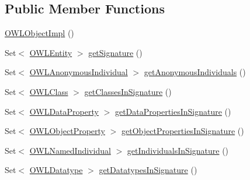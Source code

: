 \subsection*{Public Member Functions}
\begin{DoxyCompactItemize}
\item 
\hyperlink{classuk_1_1ac_1_1manchester_1_1cs_1_1owl_1_1owlapi_1_1_o_w_l_object_impl_adb32e4f033cf4062d7d9cb72f18c4ae1}{O\-W\-L\-Object\-Impl} ()
\item 
Set$<$ \hyperlink{interfaceorg_1_1semanticweb_1_1owlapi_1_1model_1_1_o_w_l_entity}{O\-W\-L\-Entity} $>$ \hyperlink{classuk_1_1ac_1_1manchester_1_1cs_1_1owl_1_1owlapi_1_1_o_w_l_object_impl_a3f510778e0d7a8bae2b6e5b7b8934654}{get\-Signature} ()
\item 
Set$<$ \hyperlink{interfaceorg_1_1semanticweb_1_1owlapi_1_1model_1_1_o_w_l_anonymous_individual}{O\-W\-L\-Anonymous\-Individual} $>$ \hyperlink{classuk_1_1ac_1_1manchester_1_1cs_1_1owl_1_1owlapi_1_1_o_w_l_object_impl_a14c25608f7bfddf821c860b3f862479e}{get\-Anonymous\-Individuals} ()
\item 
Set$<$ \hyperlink{interfaceorg_1_1semanticweb_1_1owlapi_1_1model_1_1_o_w_l_class}{O\-W\-L\-Class} $>$ \hyperlink{classuk_1_1ac_1_1manchester_1_1cs_1_1owl_1_1owlapi_1_1_o_w_l_object_impl_a1eb866bd30aefe55594f38cc228926bc}{get\-Classes\-In\-Signature} ()
\item 
Set$<$ \hyperlink{interfaceorg_1_1semanticweb_1_1owlapi_1_1model_1_1_o_w_l_data_property}{O\-W\-L\-Data\-Property} $>$ \hyperlink{classuk_1_1ac_1_1manchester_1_1cs_1_1owl_1_1owlapi_1_1_o_w_l_object_impl_ad9c426c1f4cc140b3afaf02870d80c40}{get\-Data\-Properties\-In\-Signature} ()
\item 
Set$<$ \hyperlink{interfaceorg_1_1semanticweb_1_1owlapi_1_1model_1_1_o_w_l_object_property}{O\-W\-L\-Object\-Property} $>$ \hyperlink{classuk_1_1ac_1_1manchester_1_1cs_1_1owl_1_1owlapi_1_1_o_w_l_object_impl_ac0cb9b8a630c8c2eb8759264d0baafce}{get\-Object\-Properties\-In\-Signature} ()
\item 
Set$<$ \hyperlink{interfaceorg_1_1semanticweb_1_1owlapi_1_1model_1_1_o_w_l_named_individual}{O\-W\-L\-Named\-Individual} $>$ \hyperlink{classuk_1_1ac_1_1manchester_1_1cs_1_1owl_1_1owlapi_1_1_o_w_l_object_impl_a162ee8fd6eeee784c409361a2340e926}{get\-Individuals\-In\-Signature} ()
\item 
Set$<$ \hyperlink{interfaceorg_1_1semanticweb_1_1owlapi_1_1model_1_1_o_w_l_datatype}{O\-W\-L\-Datatype} $>$ \hyperlink{classuk_1_1ac_1_1manchester_1_1cs_1_1owl_1_1owlapi_1_1_o_w_l_object_impl_a526ea786aa3cd41724490b2db111e81b}{get\-Datatypes\-In\-Signature} ()

\end{DoxyCompactItemize}
